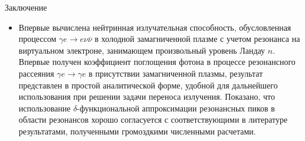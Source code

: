 \documentclass{beamer}
\begin{document}


\begin{frame}{Заключение}
\begin{itemize}
\item Впервые вычислена нейтринная 
излучательная способность, обусловленная процессом 
$\gamma e\to e\nu\bar\nu$ в холодной  замагниченной 
плазме с учетом резонанса на виртуальном электроне, 
занимающем произвольный уровень Ландау $n$. 
Впервые получен коэффициент поглощения фотона в процессе
резонансного рассеяния $\gamma e\to\gamma e$ 
в присутствии замагниченной плазмы, результат 
представлен в простой аналитической форме, 
удобной для дальнейшего использования при 
решении задачи переноса излучения. Показано, что использование  
$\delta$-функциональной аппроксимации резонансных пиков 
в области резонансов хорошо согласуется  с 
соответствующими в литературе результатами, 
полученными громоздкими численными расчетами.

\end{itemize}
\end{frame}
\end{document}

